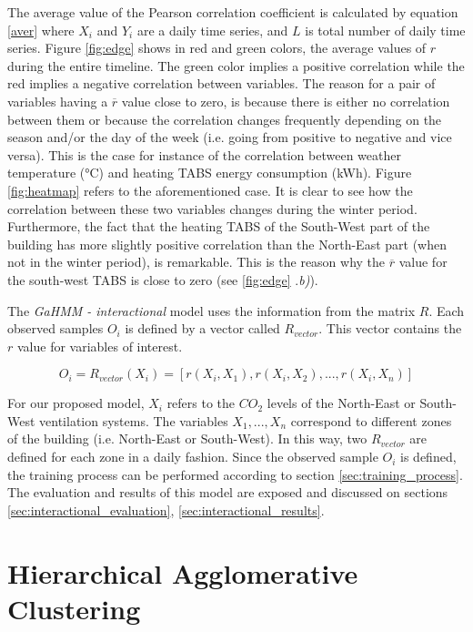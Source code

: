 The average value of the Pearson correlation coefficient is calculated by equation \ref{aver} where $X_i$ and $Y_i$ are a daily time series, and $L$ is total number of daily time series. Figure \ref{fig:edge} shows in red and green colors, the average values of $r$ during the entire timeline. The green color implies a positive correlation while the red implies a negative correlation between variables. The reason for a pair of variables having a $\overline{r}$ value close to zero, is because there is either no correlation between them or because the correlation changes frequently depending on the season and/or the day of the week (i.e. going from positive to negative and vice versa). This is the case for instance of the correlation between weather temperature (°C) and heating TABS energy consumption (kWh). Figure \ref{fig:heatmap} refers to the aforementioned case. It  is clear to see how the correlation between these two variables changes during the winter period. Furthermore, the fact that the
heating TABS of the South-West part of the building has more slightly positive correlation than the North-East part (when not in the winter period), is remarkable. This is the reason why the $\overline{r}$ value for the south-west TABS is close to zero (see \ref{fig:edge} {\color{red} .\textit{b)}}).  

The \textit{GaHMM - interactional} model uses the information from the matrix $R$. Each observed samples $O_i$ is defined by a vector called $R_{vector}$. This vector contains the $r$ value for variables of interest. 

\begin{equation}
O_i = R_{vector} (X_i) = [r(X_i,X_1), r(X_i, X_2), ..., r(X_i, X_n)]
\label{r_vector}
\end{equation}

For our proposed model, $X_i$ refers to the $CO_2$ levels of the North-East or South-West ventilation systems. The variables $X_1, ..., X_n$ correspond to different zones of the building (i.e. North-East or South-West). In this way, two $R_{vector}$ are defined for each zone in a daily fashion. Since the observed sample $O_i$ is defined, the training process can be performed according to section \ref{sec:training_process}. The evaluation and results of this model are exposed and discussed on sections \ref{sec:interactional_evaluation}, \ref{sec:interactional_results}.  


\section{Hierarchical Agglomerative Clustering}
\label{sec:hierar_agg}


